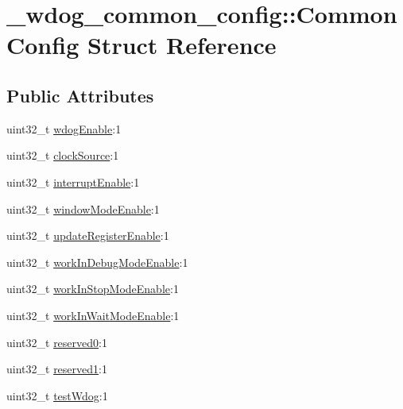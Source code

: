 \hypertarget{struct__wdog__common__config_1_1CommonConfig}{}\section{\+\_\+wdog\+\_\+common\+\_\+config\+:\+:Common\+Config Struct Reference}
\label{struct__wdog__common__config_1_1CommonConfig}
\subsection*{Public Attributes}
\begin{DoxyCompactItemize}
\item 
uint32\+\_\+t \hyperlink{struct__wdog__common__config_1_1CommonConfig_a153e2511611a0ace9deb5bd69f4e0580}{wdog\+Enable}\+:1
\item 
uint32\+\_\+t \hyperlink{struct__wdog__common__config_1_1CommonConfig_afcdbbe688f127173c963c7b2846ec353}{clock\+Source}\+:1
\item 
uint32\+\_\+t \hyperlink{struct__wdog__common__config_1_1CommonConfig_a2f30f1af1a7d08a7aa58138416bcff7d}{interrupt\+Enable}\+:1
\item 
uint32\+\_\+t \hyperlink{struct__wdog__common__config_1_1CommonConfig_a8fbb0498618d8e02945d5696610c1d9d}{window\+Mode\+Enable}\+:1
\item 
uint32\+\_\+t \hyperlink{struct__wdog__common__config_1_1CommonConfig_a118082f4538f2739cf317c02ee820d30}{update\+Register\+Enable}\+:1
\item 
uint32\+\_\+t \hyperlink{struct__wdog__common__config_1_1CommonConfig_a835368843758b9da5db644544c55ed7f}{work\+In\+Debug\+Mode\+Enable}\+:1
\item 
uint32\+\_\+t \hyperlink{struct__wdog__common__config_1_1CommonConfig_ac271318a12767990e7cadad2ecb5b06c}{work\+In\+Stop\+Mode\+Enable}\+:1
\item 
uint32\+\_\+t \hyperlink{struct__wdog__common__config_1_1CommonConfig_a10333d3fe03c8a8394318a1a3cf5c89e}{work\+In\+Wait\+Mode\+Enable}\+:1
\item 
uint32\+\_\+t \hyperlink{struct__wdog__common__config_1_1CommonConfig_a5018e6421a9dd39f740e9579ae4b9777}{reserved0}\+:1
\item 
uint32\+\_\+t \hyperlink{struct__wdog__common__config_1_1CommonConfig_a8e356a64d1d8b3d23db60cb690ba19a5}{reserved1}\+:1
\item 
uint32\+\_\+t \hyperlink{struct__wdog__common__config_1_1CommonConfig_ac606f482404de4372037e66e1c3e68ee}{test\+Wdog}\+:1

\end{DoxyCompactItemize}
